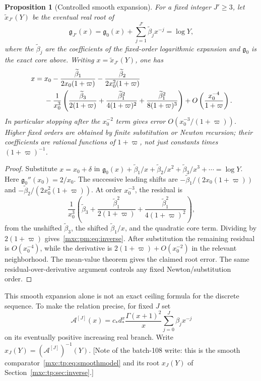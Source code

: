 \documentclass[11pt]{article}
\numberwithin{equation}{section}
\newtheorem{proposition}[theorem]{Proposition}
\theoremstyle{definition}
\theoremstyle{remark}
\begin{document}
\begin{proposition}[Controlled smooth expansion]\label{mxc:pm:prop:inverse}
For a fixed integer $J'\ge3$, let $\widetilde x_{J'}(Y)$ be the eventual real
root of
\[
 \mathfrak g_{J'}(x)=\mathfrak g_0(x)+\sum_{j=1}^{J'}\widetilde\beta_jx^{-j}=\log Y,
\]
where the $\widetilde\beta_j$ are the coefficients of the fixed-order
logarithmic expansion and $\mathfrak g_0$ is the exact core above. Writing
$x=\widetilde x_{J'}(Y)$, one has
\begin{align}\label{mxc:pm:eq:inverse}
 x={}&x_0-\frac{\widetilde\beta_1}{2x_0(1+\varpi)}-\frac{\widetilde\beta_2}{2x_0^2(1+\varpi)}\notag\\
 &-\frac1{x_0^3}\left(\frac{\widetilde\beta_3}{2(1+\varpi)}
                 +\frac{\widetilde\beta_1^2}{4(1+\varpi)^2}+\frac{\widetilde\beta_1^2}{8(1+\varpi)^3}\right)
     +O\left(\frac{x_0^{-4}}{1+\varpi}\right).
\end{align}
In particular stopping after the $x_0^{-2}$ term gives error
$O(x_0^{-3}/(1+\varpi))$. Higher fixed orders are obtained by finite
substitution or Newton recursion; their coefficients are rational functions
of $1+\varpi$, not just constants times $(1+\varpi)^{-1}$.
\end{proposition}
\begin{proof}
Substitute $x=x_0+\delta$ in
$\mathfrak g_0(x)+\widetilde\beta_1/x+\widetilde\beta_2/x^2+\widetilde\beta_3/x^3+\cdots=\log Y$.
Here $\mathfrak g_0''(x_0)=2/x_0$. The successive leading shifts are
$-\widetilde\beta_1/(2x_0(1+\varpi))$ and $-\widetilde\beta_2/(2x_0^2(1+\varpi))$. At
order $x_0^{-3}$, the residual is
\[
 \frac1{x_0^3}\left(\widetilde\beta_3+\frac{\widetilde\beta_1^2}{2(1+\varpi)}
 +\frac{\widetilde\beta_1^2}{4(1+\varpi)^2}\right),
\]
from the unshifted $\widetilde\beta_3$, the shifted $\widetilde\beta_1/x$, and the
quadratic core term. Dividing by $2(1+\varpi)$ gives~\eqref{mxc:pm:eq:inverse}.
After substitution the remaining residual is $O(x_0^{-4})$, while the
derivative is $2(1+\varpi)+O(x_0^{-2})$ in the relevant neighborhood. The
mean-value theorem gives the claimed root error. The same
residual-over-derivative argument controls any fixed Newton/substitution
order.
\end{proof}

This smooth expansion alone is not an exact ceiling formula for the discrete
sequence. To make the relation precise, for fixed $J$ set
\begin{equation}\label{mxc:pm:eq:fM}
 \mathcal A^{[J]}(x)=c_*d_*^x\frac{\Gamma(x+1)^2}{x}
                 \sum_{j=0}^J\beta_jx^{-j}
\end{equation}
on its eventually positive increasing real branch. Write
$x_J(Y)=(\mathcal A^{[J]})^{-1}(Y)$. [Note of the batch-108 write: this is
the smooth comparator~\eqref{mxc:tp:eq:smoothmodel} and its root $x_J(Y)$ of
Section~\ref{mxc:tp:sec:inverse}.]
\end{document}
